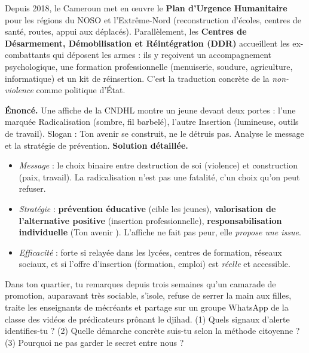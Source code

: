 \documentclass[11pt]{article}
\begin{document}
\begin{savaistu}
Depuis 2018, le Cameroun met en œuvre le \textbf{Plan d'Urgence Humanitaire} pour les régions du NOSO et l'Extrême-Nord (reconstruction d'écoles, centres de santé, routes, appui aux déplacés). Parallèlement, les \textbf{Centres de Désarmement, Démobilisation et Réintégration (DDR)} accueillent les ex-combattants qui déposent les armes : ils y reçoivent un accompagnement psychologique, une formation professionnelle (menuiserie, soudure, agriculture, informatique) et un kit de réinsertion. C'est la traduction concrète de la \emph{non-violence} comme politique d'État.
\end{savaistu}

\begin{exoresolu}
\textbf{Énoncé.} Une affiche de la CNDHL montre un jeune devant deux portes : l'une marquée \og Radicalisation \fg{} (sombre, fil barbelé), l'autre \og Insertion \fg{} (lumineuse, outils de travail). Slogan : \og Ton avenir se construit, ne le détruis pas. \fg{} Analyse le message et la stratégie de prévention.
\tcblower
\textbf{Solution détaillée.}
\begin{itemize}
\item \emph{Message} : le choix binaire entre destruction de soi (violence) et construction (paix, travail). La radicalisation n'est pas une fatalité, c'un choix qu'on peut refuser.
\item \emph{Stratégie} : \textbf{prévention éducative} (cible les jeunes), \textbf{valorisation de l'alternative positive} (insertion professionnelle), \textbf{responsabilisation individuelle} (\og Ton avenir \fg{}). L'affiche ne fait pas peur, elle \emph{propose une issue}.
\item \emph{Efficacité} : forte si relayée dans les lycées, centres de formation, réseaux sociaux, et si l'offre d'insertion (formation, emploi) est \emph{réelle} et accessible.
\end{itemize}
\end{exoresolu}

\begin{exercice}
Dans ton quartier, tu remarques depuis trois semaines qu'un camarade de promotion, auparavant très sociable, s'isole, refuse de serrer la main aux filles, traite les enseignants de \og mécréants \fg{} et partage sur un groupe WhatsApp de la classe des vidéos de prédicateurs prônant le djihad. (1) Quels signaux d'alerte identifies-tu ? (2) Quelle démarche concrète suis-tu selon la méthode citoyenne ? (3) Pourquoi ne pas garder le secret \og entre nous \fg{} ?
\end{exercice}
\end{document}
